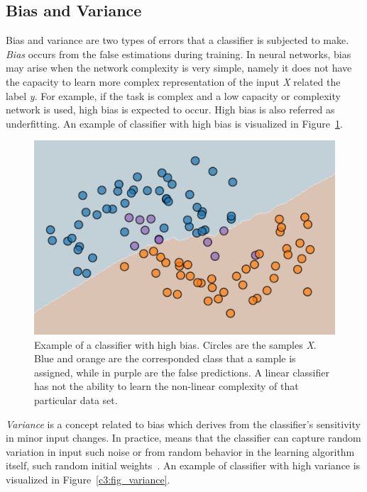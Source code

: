 \subsection{Bias and Variance}

Bias and variance are two types of errors that a classifier is subjected to make.
\textit{Bias} occurs from the false estimations during training. In neural networks, bias may arise when the network complexity is very simple, namely it does not have the capacity to learn more complex representation of the input \textit{X} related the label \textit{y}. For example, if the task is complex and a low capacity or complexity network is used, high bias is expected to occur. High bias is also referred as underfitting. An example of classifier with high bias is visualized in Figure~\ref{c3:fig_bias}.

\begin{figure}[h!]
    \centering  
    \includegraphics[width=.7\textwidth]{figures/chap3/ml/bias}
    \caption{Example of a classifier with high bias. Circles are the samples \textit{X}. Blue and orange are the corresponded class that a sample is assigned, while in purple are the false predictions. A linear classifier has not the ability to learn the non-linear complexity of that particular data set.}
    \label{c3:fig_bias}
\end{figure}

\textit{Variance} is a concept related to bias which derives from the classifier's sensitivity in minor input changes. In practice, means that the classifier can capture random variation in input such noise or from random behavior in the learning algorithm itself, such random initial weights~\cite{dietterich1995machine}.  An example of classifier with high variance is visualized in Figure~\ref{c3:fig_variance}.

